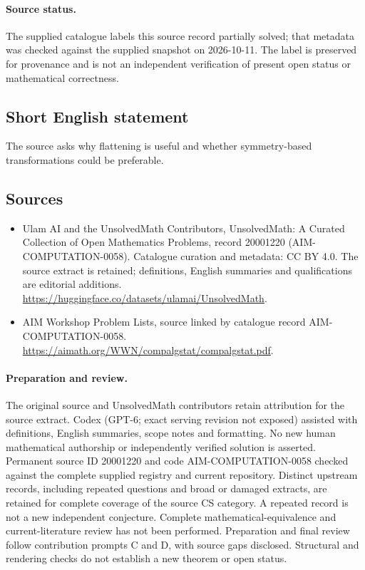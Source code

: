 \documentclass[11pt]{article}
\begin{document}
\paragraph{Source status.}
The supplied catalogue labels this source record partially solved; that metadata was checked against the supplied snapshot on 2026-10-11. The label is preserved for provenance and is not an independent verification of present open status or mathematical correctness.
\subsection{Short English statement}
The source asks why flattening is useful and whether symmetry-based transformations could be preferable.
\subsection{Sources}
\begin{itemize}
\item[\hypertarget{source:20001220:1}{S1}] Ulam AI and the UnsolvedMath Contributors, UnsolvedMath: A Curated Collection of Open Mathematics Problems, record 20001220 (AIM-COMPUTATION-0058). Catalogue curation and metadata: CC BY 4.0. The source extract is retained; definitions, English summaries and qualifications are editorial additions.
\url{https://huggingface.co/datasets/ulamai/UnsolvedMath}.
\item[\hypertarget{source:20001220:2}{S2}] AIM Workshop Problem Lists, source linked by catalogue record AIM-COMPUTATION-0058.
\url{https://aimath.org/WWN/compalgstat/compalgstat.pdf}.
\end{itemize}
\paragraph{Preparation and review.}
The original source and UnsolvedMath contributors retain attribution for the source extract. Codex (GPT-6; exact serving revision not exposed) assisted with definitions, English summaries, scope notes and formatting. No new human mathematical authorship or independently verified solution is asserted. Permanent source ID 20001220 and code AIM-COMPUTATION-0058 checked against the complete supplied registry and current repository. Distinct upstream records, including repeated questions and broad or damaged extracts, are retained for complete coverage of the source CS category. A repeated record is not a new independent conjecture. Complete mathematical-equivalence and current-literature review has not been performed. Preparation and final review follow contribution prompts C and D, with source gaps disclosed. Structural and rendering checks do not establish a new theorem or open status.
\label{end:20001220}
\end{document}

